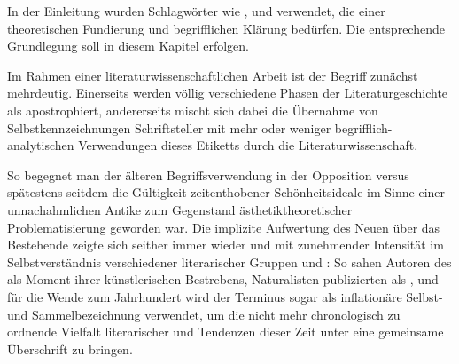 
In der Einleitung wurden Schlagwörter wie \Cite{Modernisierungsprozess},
\Cite{Modernereflexion} und \Cite{Literarische Moderne} verwendet, die einer
theoretischen Fundierung und begrifflichen Klärung bedürfen. Die entsprechende
Grundlegung soll in diesem Kapitel erfolgen.


Im Rahmen einer literaturwissenschaftlichen Arbeit ist der Begriff
\Cite{Moderne} zunächst mehrdeutig. Einerseits werden völlig verschiedene
Phasen der Literaturgeschichte als \Cite{Moderne} apostrophiert, andererseits 
mischt sich dabei die Übernahme von Selbstkennzeichnungen \Cite{moderner}
Schriftsteller mit mehr oder weniger begrifflich-analytischen Verwendungen
dieses Etiketts durch die Literaturwissenschaft.

So begegnet man der älteren Begriffsverwendung in der Opposition \Cite{modern}
versus \Cite{antik} spätestens seitdem die Gültigkeit zeitenthobener
Schönheitsideale im Sinne einer unnachahmlichen Antike zum Gegenstand
ästhetiktheoretischer Problematisierung geworden war.  Die implizite Aufwertung des Neuen über das Bestehende
zeigte sich seither immer wieder und mit zunehmender Intensität im
Selbstverständnis verschiedener literarischer Gruppen und \Cite{Avantgarden}:
So sahen Autoren des  \Cite{das Moderne} als Moment ihrer
künstlerischen Bestrebens,  Naturalisten
publizierten als \Cite{Moderne Dichtercharaktere}, und für die Wende zum
 Jahrhundert wird der Terminus \Cite{Moderne} sogar als inflationäre
Selbst- und Sammelbezeichnung verwendet, um die nicht mehr chronologisch zu
ordnende Vielfalt literarischer \Cite{Epochen} und Tendenzen dieser Zeit unter
eine gemeinsame Überschrift zu bringen.


